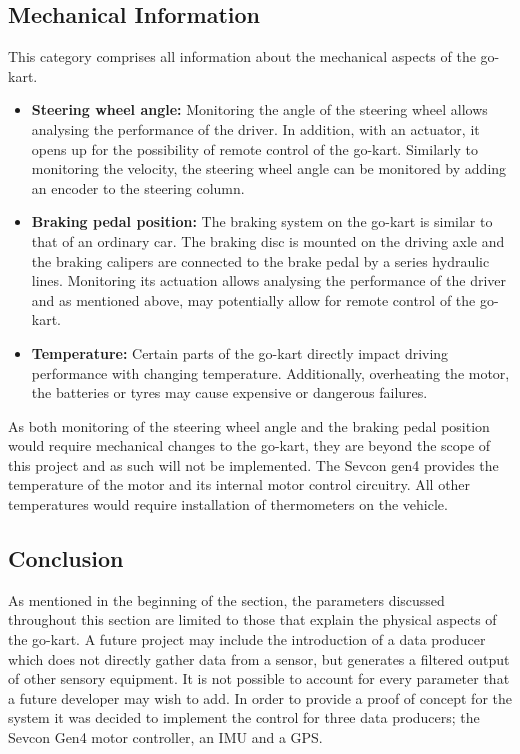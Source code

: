 \subsection{Mechanical Information}
This category comprises all information about the mechanical aspects of the go-kart.
\begin{itemize}
	\item \textbf{Steering wheel angle:} Monitoring the angle of the steering wheel allows analysing the performance of the driver.
	In addition, with an actuator, it opens up for the possibility of remote control of the go-kart.
	Similarly to monitoring the velocity, the steering wheel angle can be monitored by adding an encoder to the steering column.
	\item \textbf{Braking pedal position:} The braking system on the go-kart is similar to that of an ordinary car.
	The braking disc is mounted on the driving axle and the braking calipers are connected to the brake pedal by a series hydraulic lines.
	Monitoring its actuation allows analysing the performance of the driver and as mentioned above, may potentially allow for remote control of the go-kart.
	\item \textbf{Temperature:} Certain parts of the go-kart directly impact driving performance with changing temperature.
	Additionally, overheating the motor, the batteries or tyres may cause expensive or dangerous failures.
\end{itemize}
As both monitoring of the steering wheel angle and the braking pedal position would require mechanical changes to the go-kart, they are beyond the scope of this project and as such will not be implemented.
The Sevcon gen4 provides the temperature of the motor and its internal motor control circuitry.
All other temperatures would require installation of thermometers on the vehicle.

\subsection{Conclusion}
As mentioned in the beginning of the section, the parameters discussed throughout this section are limited to those that explain the physical aspects of the go-kart.
A future project may include the introduction of a data producer which does not directly gather data from a sensor, but generates a filtered output of other sensory equipment.
It is not possible to account for every parameter that a future developer may wish to add.
In order to provide a proof of concept for the system it was decided to implement the control for three data producers; the Sevcon Gen4 motor controller, an IMU and a GPS.

